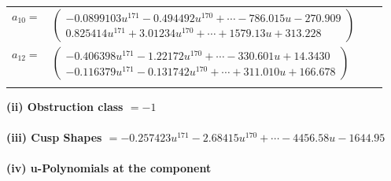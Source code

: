 \documentclass[1p]{elsarticle_modified}
\theoremstyle{definition}
\begin{document}
\begin{tabular}{m{7pt} m{180pt} m{7pt} m{180pt} }
\flushright $a_{10}=$&$\begin{pmatrix}-0.0899103 u^{171}-0.494492 u^{170}+\cdots-786.015 u-270.909\\0.825414 u^{171}+3.01234 u^{170}+\cdots+1579.13 u+313.228\end{pmatrix}$ \\
\flushright $a_{12}=$&$\begin{pmatrix}-0.406398 u^{171}-1.22172 u^{170}+\cdots-330.601 u+14.3430\\-0.116379 u^{171}-0.131742 u^{170}+\cdots+311.010 u+166.678\end{pmatrix}$\\&\end{tabular}
\flushleft \textbf{(ii) Obstruction class $= -1$}\\~\\
\flushleft \textbf{(iii) Cusp Shapes $= -0.257423 u^{171}-2.68415 u^{170}+\cdots-4456.58 u-1644.95$}\\~\\
\newpage\renewcommand{\arraystretch}{1}
\flushleft \textbf{(iv) u-Polynomials at the component}\newline \\
\end{document}
